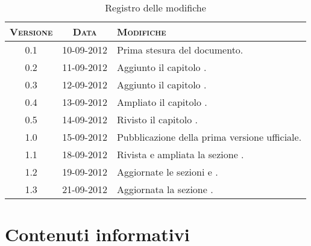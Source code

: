 \documentclass[10pt,a4paper,headinclude,footinclude,hidelinks]{scrreprt} %
\begin{document}
    \title{\rmfamily\normalfont{}}
    \author{}
    \date{\today}
    
    \maketitle
    
    \begin{abstract}
        \noindent Il documento presenta i risultati delle fasi di analisi e di progettazione dei nuovi criteri di classificazione.
    \end{abstract}
    
	\begin{table}[ht]
	\centering
	\begin{tabular}{|c|c|l|}
	\hline
	\textsc{Versione} & \textsc{Data} & \textsc{Modifiche} \\ \hline
	0.1 & 10-09-2012 & Prima stesura del documento. \\ \hline
	0.2 & 11-09-2012 & Aggiunto il capitolo \nameref{ch:stage:contenuti}. \\ \hline
	0.3 & 12-09-2012 & Aggiunto il capitolo \nameref{ch:stage:req}. \\ \hline
	0.4 & 13-09-2012 & Ampliato il capitolo \nameref{ch:stage:req}. \\ \hline
	0.5 & 14-09-2012 & Rivisto il capitolo \nameref{ch:stage:req}. \\ \hline
	1.0 & 15-09-2012 & Pubblicazione della prima versione ufficiale. \\ \hline
	1.1 & 18-09-2012 & Rivista e ampliata la sezione \nameref{ch:stage:req}. \\ \hline
	1.2 & 19-09-2012 & Aggiornate le sezioni \textit{\nameref{sec:stage:req:entità}} e \textit{\nameref{sec:stage:req:etichette}}. \\ \hline
	1.3 & 21-09-2012 & Aggiornata la sezione \textit{\nameref{sec:stage:req:contenuti}}. \\ \hline
	\end{tabular}
	\caption{Registro delle modifiche}
	\label{tab:stage:wp:workload}
	\end{table}

	\tableofcontents

	\chapter{Contenuti informativi}
	\label{ch:stage:contenuti}
\end{document}
